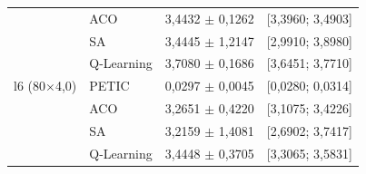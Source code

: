 \begin{table}[htb]
\begin{tabular}{llcc}
         & ACO & 3,4432 $\pm$ 0,1262 & [3,3960; 3,4903] \\
         & SA & 3,4445 $\pm$ 1,2147 & [2,9910; 3,8980] \\
         & Q-Learning & 3,7080 $\pm$ 0,1686 & [3,6451; 3,7710] \\
        \hline
        l6 (80$\times$4,0) & PETIC & 0,0297 $\pm$ 0,0045 & [0,0280; 0,0314] \\
         & ACO & 3,2651 $\pm$ 0,4220 & [3,1075; 3,4226] \\
         & SA & 3,2159 $\pm$ 1,4081 & [2,6902; 3,7417] \\
         & Q-Learning & 3,4448 $\pm$ 0,3705 & [3,3065; 3,5831] \\
        \hline
    \end{tabular}
\end{table}
